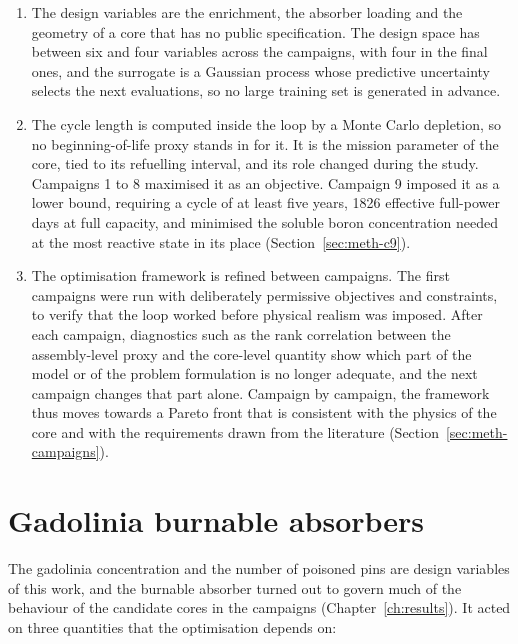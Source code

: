 \begin{enumerate}
  \item The design variables are the enrichment, the absorber loading
        and the geometry of a core that has no public specification. The
        design space has between six and four variables across the
        campaigns, with four in the final ones, and the surrogate is a
        Gaussian process whose predictive uncertainty selects the next
        evaluations, so no large training set is generated in advance.

  \item The cycle length is computed inside the loop by a Monte Carlo
        depletion, so no beginning-of-life proxy stands in for it. It is
        the mission parameter of the core, tied to its refuelling
        interval, and its role changed during the study. Campaigns 1 to 8
        maximised it as an objective. Campaign 9 imposed it as a lower
        bound, requiring a cycle of at least five years, 1826 effective
        full-power days at full capacity, and minimised the soluble
        boron concentration needed at the most reactive state in its
        place (Section~\ref{sec:meth-c9}).

  \item The optimisation framework is refined between campaigns. The
        first campaigns were run with deliberately permissive objectives
        and constraints, to verify that the loop worked before physical
        realism was imposed. After each campaign, diagnostics such as the
        rank correlation between the assembly-level proxy and the
        core-level quantity show which part of the model or of the
        problem formulation is no longer adequate, and the next campaign
        changes that part alone. Campaign by campaign, the framework thus
        moves towards a Pareto front that is consistent with the physics
        of the core and with the requirements drawn from the literature
        (Section~\ref{sec:meth-campaigns}).
\end{enumerate}

\section{Gadolinia burnable absorbers}
\label{sec:lit-gd}

The gadolinia concentration and the number of poisoned pins are design
variables of this work, and the burnable absorber turned out to govern
much of the behaviour of the candidate cores in the campaigns
(Chapter~\ref{ch:results}). It acted on three quantities that the
optimisation depends on:

